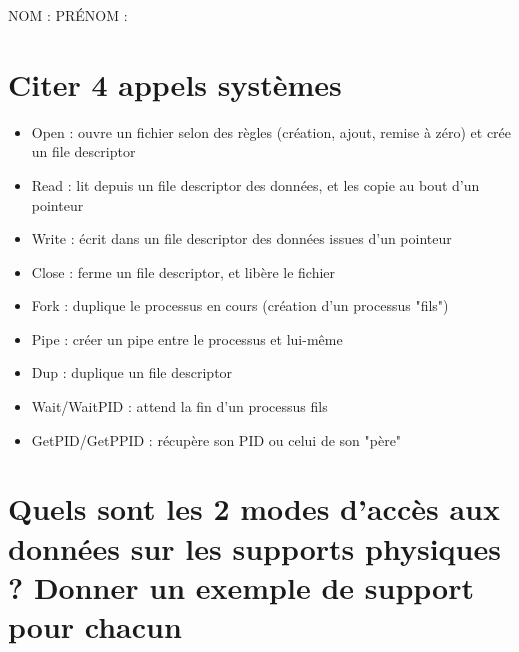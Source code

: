 \documentclass[11pt,a4paper]{article}
\author{Fabrice BOISSIER}
\begin{document}
\setlength{\fboxrule}{2pt}

\noindent {}

\bigskip

NOM : \hspace{6.5cm} PR\'ENOM :

\smallskip

\section{Citer 4 appels systèmes}

\bigskip
\begin{itemize}
\item Open : ouvre un fichier selon des règles (création, ajout, remise à zéro) et crée un file descriptor
\item Read : lit depuis un file descriptor des données, et les copie au bout d'un pointeur
\item Write : écrit dans un file descriptor des données issues d'un pointeur
\item Close : ferme un file descriptor, et libère le fichier
\item Fork : duplique le processus en cours (création d'un processus "fils")
\item Pipe : créer un pipe entre le processus et lui-même
\item Dup : duplique un file descriptor
\item Wait/WaitPID : attend la fin d'un processus fils
\item GetPID/GetPPID : récupère son PID ou celui de son "père"
\end{itemize}
\bigskip

\section{Quels sont les 2 modes d'accès aux données sur les supports physiques ? Donner un exemple de support pour chacun}
\end{document}
